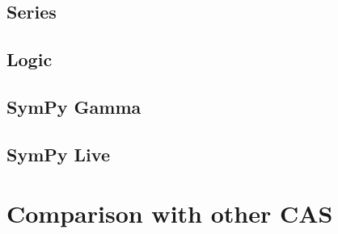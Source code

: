 \subsection{Series}



\subsection{Logic}


\subsection{SymPy Gamma}\label{sympy-gamma}



\subsection{SymPy Live}\label{sympy-live}



\section{Comparison with other CAS}


